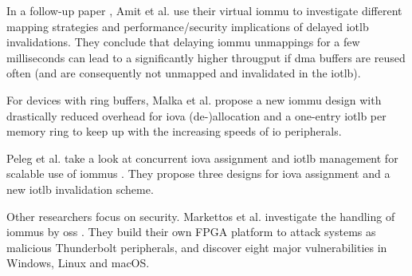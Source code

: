 In a follow-up paper \cite{amit2011viommu}, Amit et al. use their virtual
\ac{iommu} to investigate different mapping strategies and performance/security
implications of delayed \ac{iotlb} invalidations. They conclude that delaying
\ac{iommu} unmappings for a few milliseconds can lead to a significantly higher
througput if \ac{dma} buffers are reused often (and are consequently not
unmapped and invalidated in the \ac{iotlb}).

For devices with ring buffers, Malka et al. propose a new \ac{iommu} design with
drastically reduced overhead for \ac{iova} (de-)allocation and a one-entry
\ac{iotlb} per memory ring \cite{malka2015riommu} to keep up with the increasing
speeds of \ac{io} peripherals.

Peleg et al. take a look at concurrent \ac{iova} assignment and \ac{iotlb}
management for scalable use of \acp{iommu} \cite{peleg2015utilizing}. They
propose three designs for \ac{iova} assignment and a new \ac{iotlb} invalidation
scheme.


Other researchers focus on security. Markettos et al. investigate the handling
of \acp{iommu} by \aclp{os} \cite{markettos2019thunderclap}. They build their
own FPGA platform to attack systems as malicious Thunderbolt peripherals, and
discover eight major vulnerabilities in Windows, Linux and macOS.

